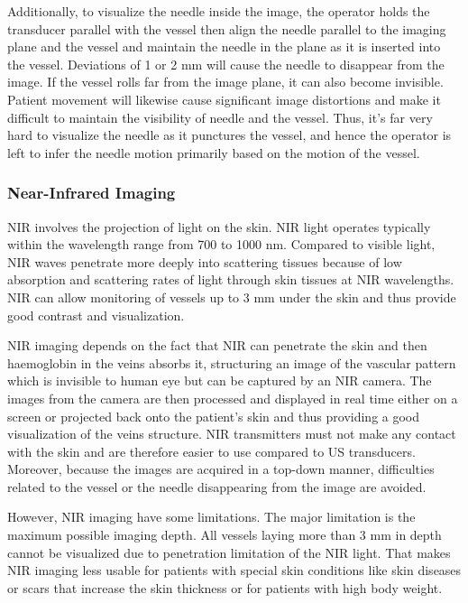 Additionally, to visualize the needle inside the image, the operator holds the transducer parallel with the vessel then align the needle parallel to the imaging plane and the vessel and maintain the needle in the plane as it is inserted into the vessel. Deviations of 1 or 2 mm will cause the needle to disappear from the image. If the vessel rolls far from the image plane, it can also become invisible. Patient movement will likewise cause significant image distortions and make it difficult to maintain the visibility of needle and the vessel. Thus, it's far very hard to visualize the needle as it punctures the vessel, and hence the operator is left to infer the needle motion primarily based on the motion of the vessel.

\subsubsection{Near-Infrared Imaging}

NIR involves the projection of light on the skin. NIR light operates typically within the wavelength range from 700 to 1000 nm. Compared to visible light, NIR waves penetrate more deeply into scattering tissues because of low absorption and scattering rates of light through skin tissues at NIR wavelengths. NIR can allow monitoring of vessels up to 3 mm under the skin and thus provide good contrast and visualization.

NIR imaging depends on the fact that NIR can penetrate the skin and then haemoglobin in the veins absorbs it, structuring an image of the vascular pattern which is invisible to human eye but can be captured by an NIR camera. The images from the camera are then processed and displayed in real time either on a screen or projected back onto the patient’s skin and thus providing a good visualization of the veins structure. NIR transmitters must not make any contact with the skin and are therefore easier to use compared to US transducers. Moreover, because the images are acquired in a top-down manner, difficulties related to the vessel or the needle disappearing from the image are avoided.

However, NIR imaging have some limitations. The major limitation is the maximum possible imaging depth. All vessels laying more than 3 mm in depth cannot be visualized due to penetration limitation of the NIR light. That makes NIR imaging less usable for patients with special skin conditions like skin diseases or scars that increase the skin thickness or for patients with high body weight.

